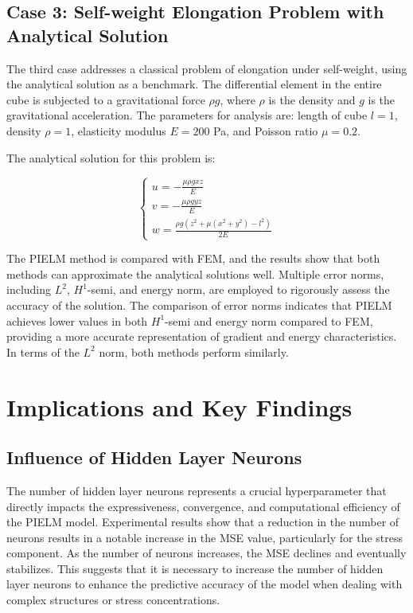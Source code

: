 \documentclass[11pt]{article}
\begin{document}
\subsection{Case 3: Self-weight Elongation Problem with Analytical Solution}

The third case addresses a classical problem of elongation under self-weight, using the analytical solution as a benchmark. The differential element in the entire cube is subjected to a gravitational force $\rho g$, where $\rho$ is the density and $g$ is the gravitational acceleration. The parameters for analysis are: length of cube $l=1$, density $\rho=1$, elasticity modulus $E=200$ Pa, and Poisson ratio $\mu=0.2$.

The analytical solution for this problem is:

\begin{equation}
\begin{cases}
u = -\frac{\mu \rho g x z}{E} \\
v = -\frac{\mu \rho g y z}{E} \\
w = \frac{\rho g(z^2 + \mu(x^2 + y^2) - l^2)}{2E}
\end{cases}
\end{equation}

The PIELM method is compared with FEM, and the results show that both methods can approximate the analytical solutions well. Multiple error norms, including $L^2$, $H^1$-semi, and energy norm, are employed to rigorously assess the accuracy of the solution. The comparison of error norms indicates that PIELM achieves lower values in both $H^1$-semi and energy norm compared to FEM, providing a more accurate representation of gradient and energy characteristics. In terms of the $L^2$ norm, both methods perform similarly.

\section{Implications and Key Findings}

\subsection{Influence of Hidden Layer Neurons}

The number of hidden layer neurons represents a crucial hyperparameter that directly impacts the expressiveness, convergence, and computational efficiency of the PIELM model. Experimental results show that a reduction in the number of neurons results in a notable increase in the MSE value, particularly for the stress component. As the number of neurons increases, the MSE declines and eventually stabilizes. This suggests that it is necessary to increase the number of hidden layer neurons to enhance the predictive accuracy of the model when dealing with complex structures or stress concentrations.
\end{document}
